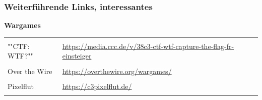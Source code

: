 \begin{frame}
    \frametitle{Weiterführende Links, interessantes}

    \textbf{\large Wargames}

    \begin{table}[H]
        \begin{tabularx}{\linewidth}{|lX|}
            &\\
            ""CTF: WTF?"" &\url{https://media.ccc.de/v/38c3-ctf-wtf-capture-the-flag-fr-einsteiger}\\
            &\\
            Over the Wire&\url{https://overthewire.org/wargames/}\\
            &\\
            Pixelflut&\url{https://c3pixelflut.de/}\\
            &\\
        \end{tabularx}
    \end{table}
\end{frame}

